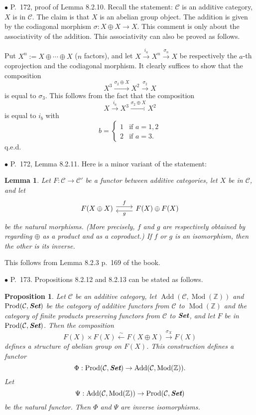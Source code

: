 \documentclass[12pt]{article}
\newtheorem{lem}[thm]{Lemma}
\newtheorem{prop}[thm]{Proposition}
\theoremstyle{remark}
\newcommand{\bu}{\bullet}
\newcommand{\n}{\noindent}
\newcommand{\C}{\mathcal C}
\newcommand{\xr}{\xrightarrow}
\newcommand{\pr}{Proposition}
\DeclareMathOperator{\Mod}{Mod}
\begin{document}

\n$\bu$ P.~172, proof of Lemma 8.2.10. Recall the statement: $\C$ is an additive category, $X$ is in $\C$. The claim is that $X$ is an abelian group object. The addition is given by the codiagonal morphism $\sigma:X\oplus X\to X$. This comment is only about the associativity of the addition. This associativity can also be proved as follows. 

Put $X^n:=X\oplus\cdots\oplus X$ ($n$ factors), and let $X\xr{i_a}X^n\xr{\sigma_n}X$ be respectively the $a$-th coprojection and the codiagonal morphism. It clearly suffices to show that the composition 
$$
X^3\xr{\sigma_2\oplus X}X^2\xr{\sigma_2}X
$$ 
is equal to $\sigma_3$. This follows from the fact that the composition 
$$
X\xr{i_a}X^3\xr{\sigma_2\oplus X}X^2
$$ 
is equal to $i_b$ with 
$$
b=\begin{cases}1&\text{if }a=1,2\\2&\text{if }a=3.\end{cases}
$$ 
q.e.d. 


\n$\bu$ P.~172, Lemma 8.2.11. Here is a minor variant of the statement: 
%
\begin{lem}
Let $F:\C\to\C'$ be a functor between additive categories, let $X$ be in $\C$, and let 
$$
\begin{tikzcd}
F(X\oplus X)\ar[yshift=.7ex]{r}{f}&F(X)\oplus F(X)\ar[yshift=-.7ex]{l}{g}
\end{tikzcd}
$$ 
be the natural morphisms. (More precisely, $f$ and $g$ are respectively obtained by regarding $\oplus$ as a product and as a coproduct.) If $f$ or $g$ is an isomorphism, then the other is its inverse. 
\end{lem}
% 
This follows from Lemma 8.2.3 p.~169 of the book.\bigskip 


\n$\bu$ P.~173. \pr s 8.2.12 and 8.2.13 can be stated as follows. 
%
\begin{prop}\label{8212}
%
Let $\C$ be an additive category, let $\operatorname{Add}(\C,\Mod(\mathbb Z))$ and $\operatorname{Prod}(\C,\textbf{\em Set})$ be the category of additive functors from $\C$ to $\Mod(\mathbb Z)$ and the category of finite products preserving functors from $\C$ to $\textbf{\em Set}$, and let $F$ be in $\operatorname{Prod}(\C,\textbf{\em Set})$. Then the composition 
$$
F(X)\times F(X)\xleftarrow\sim F(X\oplus X)\xr{\sigma_X}F(X)
$$ 
defines a structure of abelian group on $F(X)$. This construction defines a functor 
$$
\Phi:\operatorname{Prod}(\C,\textbf{\em Set})\to\operatorname{Add}(\C,\Mod(\mathbb Z)).
$$ 
Let 
$$
\Psi:\operatorname{Add}(\C,\Mod(\mathbb Z))\to\operatorname{Prod}(\C,\textbf{\em Set})
$$ 
be the natural functor. Then $\Phi$ and $\Psi$ are inverse isomorphisms. 
%
\end{prop}
\end{document}
